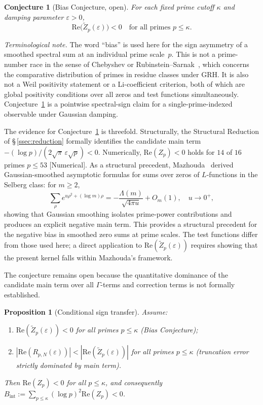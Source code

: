 \documentclass[11pt]{article}
\newtheorem{proposition}[theorem]{Proposition}
\newtheorem{conjecture}[theorem]{Conjecture}
\newcommand{\Zt}{\widetilde{Z}}
\begin{document}
\begin{conjecture}[Bias Conjecture, open]
\label{conj:bias}
For each fixed prime cutoff $\kappa$ and damping parameter $\varepsilon>0$,
\[
\mathrm{Re}\bigl(\Zt_p(\varepsilon)\bigr) < 0
\quad\text{for all primes }p\leq\kappa.
\]
\end{conjecture}

\noindent
\textit{Terminological note.}
The word ``bias'' is used here for the sign asymmetry of a smoothed
spectral sum at an individual prime scale~$p$.
This is not a prime-number race in the sense of Chebyshev or
Rubinstein--Sarnak~\cite{RubinsteinSarnak}, which concerns the
comparative distribution of primes in residue classes under GRH.
It is also not a Weil positivity statement or a Li-coefficient
criterion, both of which are global positivity conditions over all
zeros and test functions simultaneously.
Conjecture~\ref{conj:bias} is a pointwise spectral-sign claim for
a single-prime-indexed observable under Gaussian damping.

The evidence for Conjecture~\ref{conj:bias} is threefold.
Structurally, the Structural Reduction of \S\,\ref{ssec:reduction}
formally identifies the candidate main term
$-(\log p)/(2\sqrt{\pi}\,\varepsilon\sqrt{p})<0$.
Numerically, $\mathrm{Re}(Z_p)<0$ holds for $14$ of $16$ primes
$p\leq 53$ [Numerical].
As a structural precedent, Mazhouda~\cite{Mazhouda} derived
Gaussian-smoothed asymptotic formulas for sums over zeros of
$L$-functions in the Selberg class: for $m\geq 2$,
\[
\sum_\rho e^{u\rho^2+(\log m)\rho}
  = -\frac{\Lambda(m)}{\sqrt{4\pi u}} + O_m(1), \quad u\to 0^+,
\]
showing that Gaussian smoothing isolates prime-power contributions
and produces an explicit negative main term.
This provides a structural precedent for the negative bias in smoothed
zero sums at prime scales.
The test functions differ from those used here; a direct application
to $\mathrm{Re}(\Zt_p(\varepsilon))$ requires showing that the present
kernel falls within Mazhouda's framework.

The conjecture remains open because the quantitative dominance of the
candidate main term over all $\Gamma$-terms and correction terms is
not formally established.

\begin{proposition}[Conditional sign transfer]
\label{prop:sign}
Assume:
\begin{enumerate}[label=\textup{(\Alph*)}]
\item $\mathrm{Re}(\Zt_p(\varepsilon))<0$ for all primes $p\leq\kappa$
  \textup{(Bias Conjecture)};
\item $|\mathrm{Re}(R_{p,N}(\varepsilon))|<|\mathrm{Re}(\Zt_p(\varepsilon))|$
  for all primes $p\leq\kappa$
  \textup{(truncation error strictly dominated by main term)}.
\end{enumerate}
Then $\mathrm{Re}(Z_p)<0$ for all $p\leq\kappa$,
and consequently $B_{\mathrm{int}}:=
\sum_{p\leq\kappa}(\log p)^2\mathrm{Re}(Z_p)<0$.
\end{proposition}
\end{document}
